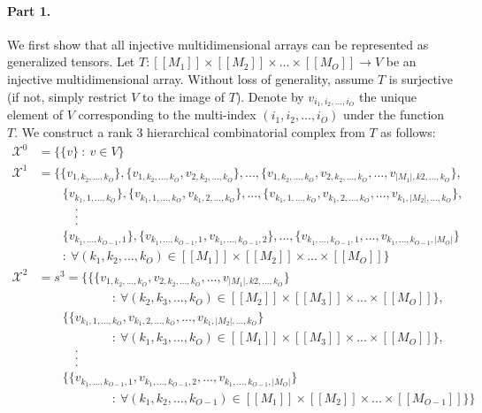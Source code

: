\documentclass{article}
\theoremstyle{plain}
\theoremstyle{definition}
\theoremstyle{remark}
\newcommand{\cX}{\mathcal{X}}
\let\oldparagraph\paragraph
\renewcommand{\paragraph}[1]{%
	\vspace{-0.5em}%
	\oldparagraph{#1}%
}
\begin{document}
	\paragraph{Part 1.}
	We first show that all injective multidimensional arrays can be represented as generalized tensors. Let $T: [[M_1]] \times [[M_2]] \times ... \times [[M_O]] \rightarrow V$ be an injective multidimensional array. Without loss of generality, assume $T$ is surjective (if not, simply restrict $V$ to the image of $T$). Denote by $v_{i_1, i_2, ..., i_O}$ the unique element of $V$ corresponding to the multi-index $(i_1, i_2, ..., i_O)$ under the function $T$. We construct a rank $3$ hierarchical combinatorial complex from $T$ as follows:
	\begin{equation*}
		\begin{aligned}
			\cX^0 &= \bigg\{ \{v\} \ : \ v \in V\bigg\}\\
			\cX^1 &= \bigg\{ \{ v_{1, k_2, ..., k_O} \}, \{ v_{1, k_2, ..., k_O}, v_{2, k_2, ..., k_O} \}, ..., \{ v_{1, k_2, ..., k_O}, v_{2, k_2, ..., k_O}, ..., v_{|M_1|, k2, ..., k_O} \},\\
			& \qquad \{ v_{k_1, 1, ..., k_O} \}, \{ v_{k_1, 1, ..., k_O}, v_{k_1, 2, ..., k_O} \}, ..., \{ v_{k_1, 1, ..., k_O}, v_{k_1, 2, ..., k_O}, ..., v_{k_1, |M_2|, ..., k_O} \},\\
			& \qquad \quad .\\
			& \qquad \quad .\\
			& \qquad \quad .\\
			& \qquad \{ v_{k_1, ..., k_{O-1}, 1} \}, \{ v_{k_1, ..., k_{O-1}, 1}, v_{k_1, ..., k_{O-1}, 2} \}, ..., \{ v_{k_1, ..., k_{O-1}, 1}, ..., v_{k_1, ..., k_{O-1}, |M_O|} \}\\
			& \qquad : \ \forall (k_1, k_2, ..., k_O) \in [[M_1]] \times [[M_2]] \times ... \times [[M_O]] \bigg\}\\
			\cX^2 &= s^3 = \bigg\{ \big\{ \{ v_{1, k_2, ..., k_O}, v_{2, k_2, ..., k_O}, ..., v_{|M_1|, k2, ..., k_O} \} \\
			& \qquad \qquad \qquad  : \ \forall (k_2, k_3, ..., k_O) \in [[M_2]] \times [[M_3]] \times ... \times [[M_O]] \big\},\\
			& \qquad \big\{ \{ v_{k_1, 1, ..., k_O}, v_{k_1, 2, ..., k_O}, ..., v_{k_1, |M_2|, ..., k_O} \} \\
			&\qquad \qquad \qquad : \ \forall (k_1, k_3, ..., k_O) \in [[M_1]] \times [[M_3]] \times ... \times [[M_O]] \big\},\\
			& \qquad \quad .\\
			& \qquad \quad .\\
			& \qquad \quad .\\
			& \qquad \big\{ \{ v_{k_1, ..., k_{O-1}, 1}, v_{k_1, ..., k_{O-1}, 2}, ..., v_{k_1, ..., k_{O-1}, |M_O|} \} \\
			&\qquad \qquad \qquad : \ \forall (k_1, k_2, ..., k_{O-1}) \in [[M_1]] \times [[M_2]] \times ... \times [[M_{O-1}]] \big\} \bigg\}
		\end{aligned}
	\end{equation*}
\end{document}
